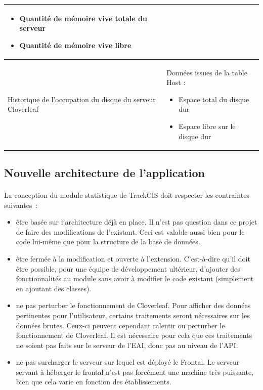 \begin{table}[H]
\begin{tabular}{| p{5cm} | p{8cm} |}
\begin{itemize}
						  \item Quantité de mémoire vive totale du serveur
						  \item Quantité de mémoire vive libre
						\end{itemize}
						\\
					\hline
						Historique de l'occupation du disque du serveur Cloverleaf
						&
						Données issues de la table Host :
						\begin{itemize}
						  \item Espace total du disque dur
						  \item Espace libre sur le disque dur
						\end{itemize}
						\\
					\hline
				\end{tabular}
			\end{table}
		
		\subsection{Nouvelle architecture de l'application}
			\paragraph{}%
			La conception du module statistique de TrackCIS doit respecter les
			contraintes suivantes~:
			\begin{itemize}%
			  \item être basée sur l'architecture déjà en place. Il n'est pas question
			  dans ce projet de faire des modifications de l'existant. Ceci est
			  valable aussi bien pour le code lui-même que pour la structure de la base
			  de données.
			  \item être fermée à la modification et ouverte à l'extension. C'est-à-dire
			  qu'il doit être possible, pour une équipe de développement ultérieur,
			  d'ajouter des fonctionnalités au module sans avoir à modifier le code
			  existant (simplement en ajoutant des classes).
			  \item ne pas perturber le fonctionnement de Cloverleaf. Pour afficher des
			  données pertinentes pour l'utilisateur, certains traitements seront
			  nécessaires sur les données brutes. Ceux-ci peuvent cependant ralentir ou
			  perturber le fonctionnement de Cloverleaf. Il est nécessaire pour cela que
			  ces traitements ne soient pas faits sur le serveur de l'EAI, donc pas au
			  niveau de l'API.
			  \item ne pas surcharger le serveur sur lequel est déployé le Frontal. Le
			  serveur servant à héberger le frontal n'est pas forcément une machine très
			  puissante, bien que cela varie en fonction des établissements.
			\end{itemize}
			
